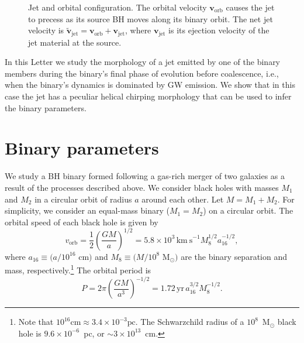 \documentclass[a4paper,fleqn,usenatbib]{mnras}
\begin{document}
\begin{figure}
  \begin{center}
  \end{center}
  \caption{Jet and orbital configuration. The orbital velocity
    $\mathbf{v}_\mathrm{orb}$ causes the jet to precess as its source
    BH moves along its binary orbit. The net jet velocity is
    $\tilde{\mathbf{v}}_\mathrm{jet}={\mathbf{v}}_\mathrm{orb}+{\mathbf{v}}_\mathrm{jet}$,
    where $\mathbf{v}_\mathrm{jet}$ is its ejection velocity of the
    jet material at the source.}
  \label{fig:BH_orbit}
\end{figure}

In this Letter we study the morphology of a jet emitted by one of the
binary members during the binary's final phase of evolution before
coalescence, i.e., when the binary's dynamics is dominated by GW
emission.  We show that in this case the jet has a peculiar helical
chirping morphology that can be used to infer the binary parameters.

\section{Binary parameters}

We study a BH binary formed following a gas-rich merger of two
galaxies as a result of the processes described above.  We consider
black holes with masses $M_1$ and $M_2$ in a circular orbit of radius
$a$ around each other.  Let $M=M_1+M_2$.  For simplicity, we consider
an equal-mass binary ($M_1=M_2$) on a circular orbit. The orbital
speed of each black hole is given by \citep{2010PhRvD..81d7503L}
\begin{equation}
  v_\mathrm{orb} = \frac{1}{2}\left(\frac{GM}{a}\right)^{1/2}\!\!\!\! = 5.8\times 10^3\, \mathrm{km~s}^{-1}M_8^{1/2}a_{16}^{-1/2},
  \label{eqn:vorb}
\end{equation}
where $a_{16}\equiv (a/10^{16}$ cm$)$ and $M_8\equiv (M/10^8$
M$_\odot)$ are the binary separation and mass,
respectively.\footnote{Note that $10^{16} \mathrm{cm}\approx 3.4\times
  10^{-3} \mathrm{pc}$.  The Schwarzchild radius of a $10^8$~M$_\odot$
  black hole is $9.6\times 10^{-6}$~pc, or $\sim 3\times 10^{13}$~cm.}
The orbital period is
\begin{equation}
  P = 2\pi\left(\frac{GM}{a^3}\right)^{-1/2}\!\!\!\! = 1.72\, \mathrm{yr}\, a_{16}^{3/2} M_8^{-1/2}.
\end{equation}
\end{document}
